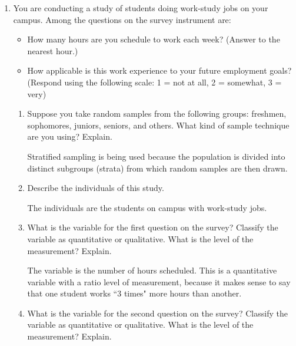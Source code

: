 \documentclass{article}
\newcommand{\answer}[1]{\color{red}#1}
\begin{document}
\pagestyle{myheadings}

\begin{center}

\textbf{}
\end{center}

\begin{enumerate}
\item You are conducting a study of students doing work-study jobs on your campus.  Among the questions on the survey instrument are:
	\begin{itemize}
	\item How many hours are you schedule to work each week?  (Answer to the nearest hour.)
	\item How applicable is this work experience to your future employment goals?  (Respond using the following scale: 1 = not at all, 2 = somewhat, 3 = very)
	\end{itemize}
	
	\begin{enumerate}
	
	\item Suppose you take random samples from the following groups: freshmen, sophomores, juniors, seniors, and others.  What kind of sample technique are you using?  Explain. 
	
	{\answer Stratified sampling is being used because the population is divided into distinct subgroups (strata) from which random samples are then drawn.}
	\vfill
	
	\item Describe the individuals of this study. 
	
	{\answer The individuals are the students on campus with work-study jobs.}
	\vfill
	
	\item What is the variable for the first question on the survey?  Classify the variable as quantitative or qualitative.  What is the level of the measurement?  Explain. 
	
	{\answer The variable is the number of hours scheduled.  This is a quantitative variable with a ratio level of measurement, because it makes sense to say that one student works ``3 times" more hours than another.}
	\vfill
	
	\item What is the variable for the second question on the survey?  Classify the variable as quantitative or qualitative.  What is the level of the measurement?  Explain. 
	

\end{enumerate}
\end{enumerate}
\end{document}
